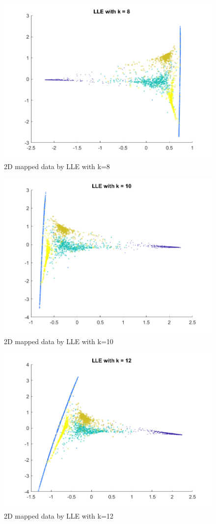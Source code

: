 \documentclass{article}
\begin{document}
{    \begin{figure}[H]
        \centering
        \includegraphics[width = 0.8\linewidth]{Q2/LLE_8.png}
        \caption{2D mapped data by LLE with k=8}
    \end{figure}

    \begin{figure}[H]
        \centering
        \includegraphics[width = 0.8\linewidth]{Q2/LLE_10.png}
        \caption{2D mapped data by LLE with k=10}
    \end{figure}

    \begin{figure}[H]
        \centering
        \includegraphics[width = 0.8\linewidth]{Q2/LLE_12.png}
        \caption{2D mapped data by LLE with k=12}
    \end{figure}

}
\end{document}
